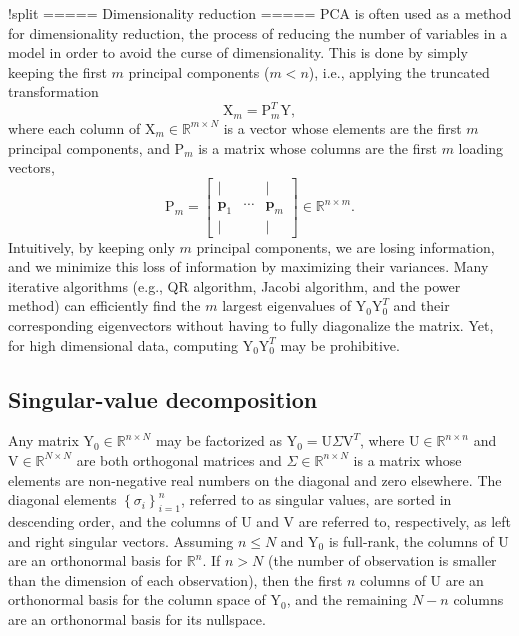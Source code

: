!split
===== Dimensionality reduction =====
PCA is often used as a method for dimensionality reduction, the process of reducing the number of variables in a model in order to avoid the curse of dimensionality. This is done by simply keeping the first $m$ principal components ($m<n$), i.e., applying the truncated transformation
\[
\text{X}_m = \text{P}_m^T \text{Y},
\]
where each column of $\text{X}_m \in \mathbb{R}^{m \times N}$ is a vector whose elements are the first $m$ principal components, and $\text{P}_m$ is a matrix whose columns are the first $m$ loading vectors,
\[
\text{P}_m = \left[\begin{array}{ccc}
\mid &  & \mid\\
\textbf{p}_{1} & \cdots & \textbf{p}_{m}\\
\mid &  & \mid
\end{array}\right] \in \mathbb{R}^{n \times m}.
\]
Intuitively, by keeping only $m$ principal components, we are losing information, and we minimize this loss of information by maximizing their variances. Many iterative algorithms (e.g., QR algorithm, Jacobi algorithm, and the power method) can efficiently find the $m$ largest eigenvalues of $\text{Y}_0 \text{Y}_0^T$ and their corresponding eigenvectors without having to fully diagonalize the matrix. Yet, for high dimensional data, computing $\text{Y}_0 \text{Y}_0^T$ may be prohibitive.

\subsection{Singular-value decomposition}
Any matrix $\text{Y}_0 \in \mathbb{R}^{n \times N}$ may be factorized as $\text{Y}_0 = \text{U} \Sigma \text{V}^T$, where $\text{U} \in \mathbb{R}^{n \times n}$ and $\text{V} \in \mathbb{R}^{N \times N}$ are both orthogonal matrices and $\Sigma \in \mathbb{R}^{n \times N}$ is a matrix whose elements are non-negative real numbers on the diagonal and zero elsewhere. The diagonal elements $\left\{ \sigma_i \right\}_{i=1}^n$, referred to as singular values, are sorted in descending order, and the columns of $\text{U}$ and $\text{V}$ are referred to, respectively, as left and right singular vectors. Assuming $n \leq N$ and $\text{Y}_0$ is full-rank, the columns of $\text{U}$ are an orthonormal basis for $\mathbb{R}^n$. If $n > N$ (the number of observation is smaller than the dimension of each observation), then the first $n$ columns of $\text{U}$ are an orthonormal basis for the column space of $\text{Y}_0$, and the remaining $N-n$ columns are an orthonormal basis for its nullspace.

